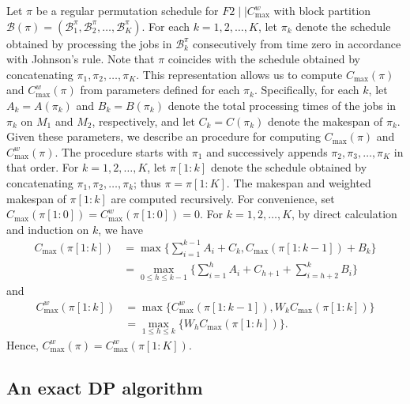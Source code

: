 \documentclass[12pt]{article}
\begin{document}
\begin{sloppypar}
        Let $\pi$ be a regular permutation schedule for $F2 \mid \mid C_{\max}^w$ with block partition $\mathcal{B}(\pi)=(\mathcal{B}_1^{\pi}, \mathcal{B}_2^{\pi}, \ldots, \mathcal{B}_K^{\pi})$. For each $k=1, 2, \ldots, K$, let $\pi_k$ denote the schedule obtained by processing the jobs in $\mathcal{B}_k^{\pi}$ consecutively from time zero in accordance with Johnson’s rule. Note that $\pi$ coincides with the schedule obtained by concatenating $\pi_1, \pi_2, \ldots, \pi_K$. This representation allows us to compute $C_{\max}(\pi)$ and $C_{\max}^w(\pi)$ from parameters defined for each $\pi_k$. Specifically, for each $k$, let $A_k=A(\pi_k)$ and $B_k=B(\pi_k)$ denote the total processing times of the jobs in $\pi_k$ on $M_1$ and $M_2$, respectively, and let $C_k=C(\pi_k)$ denote the makespan of $\pi_k$. Given these parameters, we describe an procedure for computing $C_{\max}(\pi)$ and $C_{\max}^w(\pi)$. The procedure starts with $\pi_1$ and successively appends $\pi_2, \pi_3, \ldots, \pi_K$ in that order. For $k=1, 2, \ldots, K$, let $\pi[1:k]$ denote the schedule obtained by concatenating $\pi_1, \pi_2, \ldots, \pi_k$; thus $\pi=\pi[1:K]$. The makespan and weighted makespan of $\pi[1: k]$ are computed recursively. For convenience, set $C_{\max}(\pi[1: 0])=C_{\max}^w(\pi[1: 0])=0$. For $k=1, 2, \ldots, K$, by direct calculation and induction on $k$, we have
        \begin{equation}
            \begin{aligned} \label{eq-4.2:block-makespan}
                C_{\max}(\pi[1: k]) &=\max \Big\{\sum_{i=1}^{k-1} A_i+C_k, C_{\max}(\pi[1: k-1])+B_k\Big\}  \\
                &= \max_{0 \leq h \leq k-1} \Big\{ \sum_{i=1}^h A_i +C_{h+1} + \sum_{i=h+2}^k B_i \Big\} 
            \end{aligned}
        \end{equation}
        and 
        \begin{equation}\label{eq-4.2:block-weighted makespan}
            \begin{aligned} 
                C_{\max}^w(\pi[1: k]) &=\max \{C_{\max}^w(\pi[1: k-1]), W_k C_{\max}(\pi[1: k])\}  \\
                &= \max_{1 \leq h \leq k} \{W_h C_{\max}(\pi[1: h])\}. 
            \end{aligned}
        \end{equation}
        Hence, $C_{\max}^w(\pi)=C_{\max}^w(\pi[1: K])$.
        
        \subsection{An exact DP algorithm} \label{sec-DP}
        

\end{sloppypar}
\end{document}
